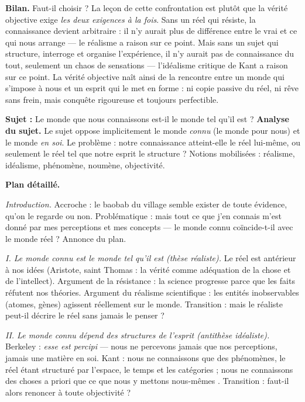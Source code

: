 \documentclass[11pt]{article}
\begin{document}
\textbf{Bilan.} Faut-il choisir ? La leçon de cette confrontation est plutôt que la vérité objective exige \emph{les deux exigences à la fois}. Sans un réel qui résiste, la connaissance devient arbitraire : il n'y aurait plus de différence entre le vrai et ce qui nous arrange — le réalisme a raison sur ce point. Mais sans un sujet qui structure, interroge et organise l'expérience, il n'y aurait pas de connaissance du tout, seulement un chaos de sensations — l'idéalisme critique de Kant a raison sur ce point. La vérité objective naît ainsi de la rencontre entre un monde qui s'impose à nous et un esprit qui le met en forme : ni copie passive du réel, ni rêve sans frein, mais conquête rigoureuse et toujours perfectible.

\begin{exoresolu}
\textbf{Sujet :} Le monde que nous connaissons est-il le monde tel qu'il est ?
\tcblower
\textbf{Analyse du sujet.} Le sujet oppose implicitement le monde \emph{connu} (le monde pour nous) et le monde \emph{en soi}. Le problème : notre connaissance atteint-elle le réel lui-même, ou seulement le réel tel que notre esprit le structure ? Notions mobilisées : réalisme, idéalisme, phénomène, noumène, objectivité.

\textbf{Plan détaillé.}

\emph{Introduction.} Accroche : le baobab du village semble exister de toute évidence, qu'on le regarde ou non. Problématique : mais tout ce que j'en connais m'est donné par mes perceptions et mes concepts — le monde connu coïncide-t-il avec le monde réel ? Annonce du plan.

\emph{I. Le monde connu est le monde tel qu'il est (thèse réaliste).} Le réel est antérieur à nos idées (Aristote, saint Thomas : la vérité comme adéquation de la chose et de l'intellect). Argument de la résistance : la science progresse parce que les faits réfutent nos théories. Argument du réalisme scientifique : les entités inobservables (atomes, gènes) agissent réellement sur le monde. Transition : mais le réaliste peut-il décrire le réel sans jamais le penser ?

\emph{II. Le monde connu dépend des structures de l'esprit (antithèse idéaliste).} Berkeley : \emph{esse est percipi} — nous ne percevons jamais que nos perceptions, jamais une matière en soi. Kant : nous ne connaissons que des phénomènes, le réel étant structuré par l'espace, le temps et les catégories ; \guillemotleft nous ne connaissons des choses a priori que ce que nous y mettons nous-mêmes \guillemotright. Transition : faut-il alors renoncer à toute objectivité ?


\end{exoresolu}
\end{document}
